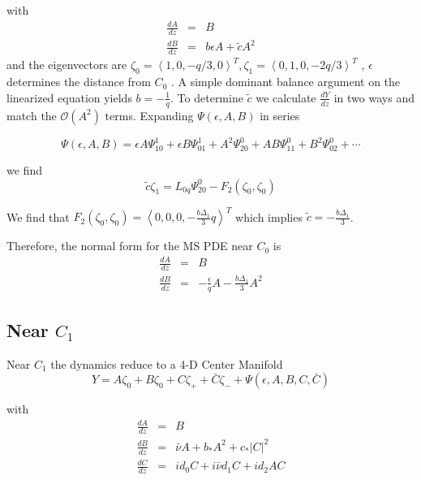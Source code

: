 with 
\begin{subequations}
\begin{eqnarray}
\frac{dA}{dz} &=& B \\
\frac{dB}{dz} &=& b \epsilon A + \tilde{c} A^2
\end{eqnarray}
\end{subequations}
and the eigenvectors are $\zeta_0 = \left<1,0,-q/3,0\right>^T, \zeta_1 = \left<0,1,0,-2 q/3\right>^T $ , $\epsilon$ determines the distance from $C_0$ .
A simple dominant balance argument on the linearized equation yields $b=-\frac{1}{q}$.
To determine $\tilde{c}$ we calculate $\frac{dY}{dz}$ in two ways and match the $\mathcal{O}(A^2)$ terms. Expanding $\Psi(\epsilon,A,B)$ in series 

\begin{equation}
\Psi(\epsilon,A,B) = \epsilon A \Psi_{10}^1 + \epsilon B \Psi_{01}^1 + A^2 \Psi_{20}^0 + A B \Psi_{11}^0 + B^2 \Psi_{02}^0 + \cdots
\end{equation}

we find \begin{equation} \tilde{c} \zeta_1 = L_{0q} \Psi_{20}^0 - F_2(\zeta_0,\zeta_0) \end{equation}

We find that $F_2(\zeta_0,\zeta_0) = \left<0,0,0,-\frac{ b \Delta_1 }{3} q \right>^T$ which implies $\tilde{c} = - \frac{b \Delta_1}{3} $.

Therefore, the normal form for the MS PDE near $C_0$ is
\begin{subequations}
\begin{eqnarray}
\frac{dA}{dz} &=& B \\
\frac{dB}{dz} &=& -\frac{\epsilon}{q} A - \frac{ b \Delta_1}{3}  A^2
\end{eqnarray}
\end{subequations}
\subsection{ Near $C_1$ }
Near $C_1$ the dynamics reduce to a 4-D Center Manifold
\begin{equation} Y = A \zeta_0 + B \zeta_0 + C \zeta_+ + \bar{C} \zeta_- + \Psi(\epsilon,A,B,C,\bar{C})
\end{equation}

with 
\begin{subequations}
\begin{eqnarray}
\frac{dA}{dz} &=& B \\ \label{eq:aq}
\frac{dB}{dz} &=& \bar{\nu} A + b_* A^2 + c_* \left|C\right|^2 \\ \label{eq:bq}
\frac{dC}{dz} &=& i d_0 C + i \bar{\nu} d_1 C + i d_2 A C \label{eq:cq}
\end{eqnarray}
\end{subequations}

